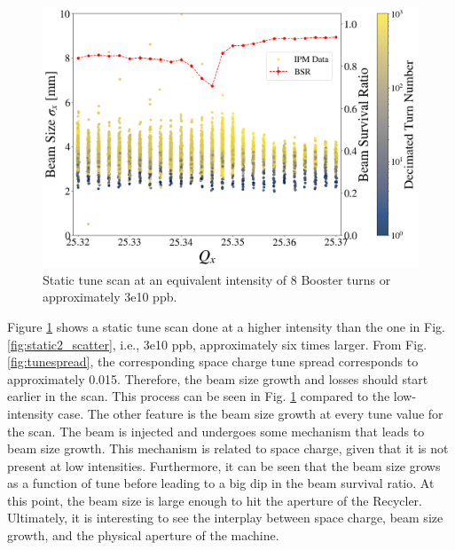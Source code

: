 \begin{figure}[H]
    \centering
    \includegraphics[width=\columnwidth]{chapter6/static8turns_dampersOFF.png}
    \caption{Static tune scan at an equivalent intensity of 8 Booster turns or approximately 3e10 ppb.}
    \label{fig:static8_scatter}
   \vspace{-1.25em}
\end{figure}

Figure \ref{fig:static8_scatter} shows a static tune scan done at a higher intensity than the one in Fig. \ref{fig:static2_scatter}, i.e., 3e10 ppb, approximately six times larger. From Fig. \ref{fig:tunespread}, the corresponding space charge tune spread corresponds to approximately 0.015. Therefore, the beam size growth and losses should start earlier in the scan. This process can be seen in Fig. \ref{fig:static8_scatter} compared to the low-intensity case. The other feature is the beam size growth at every tune value for the scan. The beam is injected and undergoes some mechanism that leads to beam size growth. This mechanism is related to space charge, given that it is not present at low intensities. Furthermore, it can be seen that the beam size grows as a function of tune before leading to a big dip in the beam survival ratio. At this point, the beam size is large enough to hit the aperture of the Recycler. Ultimately, it is interesting to see the interplay between space charge, beam size growth, and the physical aperture of the machine.      

